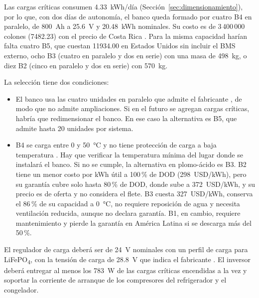 Las cargas críticas consumen \SI{4.33}{kWh}/día (Sección~\ref{sec:dimensionamiento}), por lo que, con dos días de autonomía, el banco queda formado por cuatro B4 en paralelo, de \SI{800}{Ah} a \SI{25.6}{V} y \SI{20.48}{kWh} nominales. Su costo es de 3\,400\,000 colones (\SI{7482.23}{\USD}) con el precio de Costa Rica \cite{kuat}. Para la misma capacidad harían falta cuatro B5, que cuestan \SI{11934.00}{\USD} en Estados Unidos sin incluir el BMS externo, ocho B3 (cuatro en paralelo y dos en serie) con una masa de \SI{498}{kg}, o diez B2 (cinco en paralelo y dos en serie) con \SI{570}{kg}.

La selección tiene dos condiciones:
\begin{itemize}
\item El banco usa las cuatro unidades en paralelo que admite el fabricante \cite{pq_manual}, de modo que no admite ampliaciones. Si en el futuro se agregan cargas críticas, habría que redimensionar el banco. En ese caso la alternativa es B5, que admite hasta 20 unidades por sistema.
\item B4 se carga entre 0 y \SI{50}{\celsius} y no tiene protección de carga a baja temperatura \cite{pq}. Hay que verificar la temperatura mínima del lugar donde se instalará el banco. Si no se cumple, la alternativa en plomo-ácido es B3. B2 tiene un menor costo por kWh útil a 100\,\% de DOD (\SI{298}{USD/kWh}), pero su garantía cubre solo hasta 80\,\% de DOD, donde sube a \SI{372}{USD/kWh}, y su precio es de oferta y no considera el flete. B3 cuesta \SI{327}{USD/kWh}, conserva el 86\,\% de su capacidad a \SI{0}{\celsius}, no requiere reposición de agua y necesita ventilación reducida, aunque no declara garantía. B1, en cambio, requiere mantenimiento y pierde la garantía en América Latina si se descarga más del 50\,\%.
\end{itemize}

El regulador de carga deberá ser de \SI{24}{V} nominales con un perfil de carga para LiFePO\textsubscript{4}, con la tensión de carga de \SI{28.8}{V} que indica el fabricante \cite{pq_manual}. El inversor deberá entregar al menos los \SI{783}{W} de las cargas críticas encendidas a la vez y soportar la corriente de arranque de los compresores del refrigerador y el congelador.